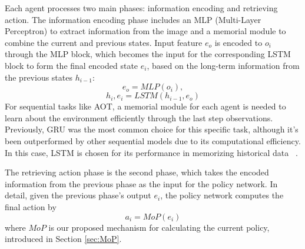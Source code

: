 \documentclass[sigconf]{aamas}
\begin{document}
Each agent processes two main phases: information encoding and retrieving action. The information encoding phase includes an MLP (Multi-Layer Perceptron) to extract information from the image and a memorial module to combine the current and previous states. Input feature \(e_o\) is encoded to \(o_i\) through the MLP block, which becomes the input for the corresponding LSTM block to form the final encoded state \(e_i\), based on the long-term information from the previous states \(h_{i-1}\): 
\begin{equation} e_o = MLP(o_i),\end{equation}
\begin{equation} h_i, e_i = LSTM(h_{i-1}, e_o)\end{equation}
For sequential tasks like AOT, a memorial module for each agent is needed to learn about the environment efficiently through the last step observations. Previously, GRU was the most common choice for this specific task, although it's been outperformed by other sequential models due to its computational efficiency. In this case, LSTM is chosen for its performance in memorizing historical data ~\cite{chung2014empiricalevaluationgatedrecurrent}. 

The retrieving action phase is the second phase, which takes the encoded information from the previous phase as the input for the policy network. In detail, given the previous phase's output \(e_i\), the policy network computes the final action by
\begin{equation}
a_i = MoP(e_i)
\end{equation}
where \(MoP\) is our proposed mechanism for calculating the current policy, introduced in Section \ref{sec:MoP}.
\end{document}
